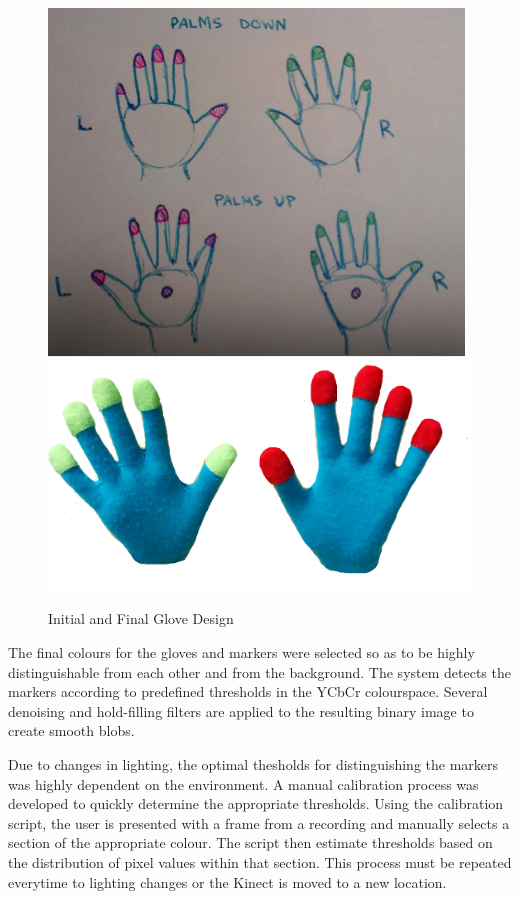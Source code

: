 \documentclass[12pt]{article}
\begin{document}
\begin{figure}[h!]
  \centering
  \includegraphics[scale=1]{GloveDesign.png} \qquad
  \includegraphics[scale=0.15]{Gloves.png}
  \caption{Initial and Final Glove Design}
  \label{glove_design}
\end{figure}

The final colours for the gloves and markers were selected so as to be highly distinguishable from each other and from the background. The system detects the markers according to predefined thresholds in the YCbCr colourspace. Several denoising and hold-filling filters are applied to the resulting binary image to create smooth blobs.

Due to changes in lighting, the optimal thesholds for distinguishing the markers was highly dependent on the environment. A manual calibration process was developed to quickly determine the appropriate thresholds. Using the calibration script, the user is presented with a frame from a recording and manually selects a section of the appropriate colour. The script then estimate thresholds based on the distribution of pixel values within that section. This process must be repeated everytime to lighting changes or the Kinect is moved to a new location.
\end{document}
